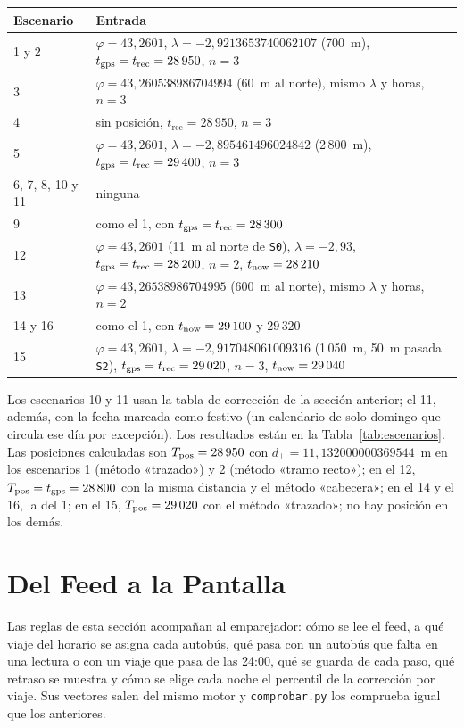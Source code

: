 \begin{center}
\small
\begin{tabularx}{\textwidth}{@{}l>{\raggedright\arraybackslash}X@{}}
\toprule
Escenario & Entrada\\
\midrule
1 y 2 & $\varphi=43{,}2601$, $\lambda=-2{,}9213653740062107$ (700~m), $t_{\mathrm{gps}}=t_{\mathrm{rec}}=28\,950$, $n=3$\\
3 & $\varphi=43{,}260538986704994$ (60~m al norte), mismo $\lambda$ y horas, $n=3$\\
4 & sin posición, $t_{\mathrm{rec}}=28\,950$, $n=3$\\
5 & $\varphi=43{,}2601$, $\lambda=-2{,}895461496024842$ (2\,800~m), $t_{\mathrm{gps}}=t_{\mathrm{rec}}=29\,400$, $n=3$\\
6, 7, 8, 10 y 11 & ninguna\\
9 & como el 1, con $t_{\mathrm{gps}}=t_{\mathrm{rec}}=28\,300$\\
12 & $\varphi=43{,}2601$ (11~m al norte de \texttt{S0}), $\lambda=-2{,}93$, $t_{\mathrm{gps}}=t_{\mathrm{rec}}=28\,200$, $n=2$, $t_{\mathrm{now}}=28\,210$\\
13 & $\varphi=43{,}26538986704995$ (600~m al norte), mismo $\lambda$ y horas, $n=2$\\
14 y 16 & como el 1, con $t_{\mathrm{now}}=29\,100$ y $29\,320$\\
15 & $\varphi=43{,}2601$, $\lambda=-2{,}917048061009316$ (1\,050~m, 50~m pasada \texttt{S2}), $t_{\mathrm{gps}}=t_{\mathrm{rec}}=29\,020$, $n=3$, $t_{\mathrm{now}}=29\,040$\\
\bottomrule
\end{tabularx}
\end{center}

\noindent Los escenarios 10 y 11 usan la tabla de corrección de la sección anterior; el 11, además, con la fecha
marcada como festivo (un calendario de solo domingo que circula ese día por excepción). Los resultados están en la
Tabla~\ref{tab:escenarios}. Las posiciones calculadas son $T_{\mathrm{pos}}=28\,950$ con
$d_\perp=11{,}132000000369544$~m en los escenarios 1 (método «trazado») y 2 (método «tramo recto»); en el 12,
$T_{\mathrm{pos}}=t_{\mathrm{gps}}=28\,800$ con la misma distancia y el método «cabecera»; en el 14 y el 16, la del 1; en el 15,
$T_{\mathrm{pos}}=29\,020$ con el método «trazado»; no hay posición en los demás.

\section{Del Feed a la Pantalla}

Las reglas de esta sección acompañan al emparejador: cómo se lee el feed, a qué viaje del horario se asigna cada
autobús, qué pasa con un autobús que falta en una lectura o con un viaje que pasa de las 24:00, qué se guarda de cada paso, qué retraso
se muestra y cómo se elige cada noche el percentil de la corrección por viaje. Sus vectores salen del mismo motor y
\texttt{comprobar.py} los comprueba igual que los anteriores.

